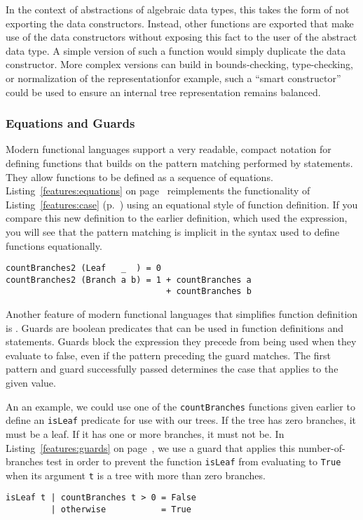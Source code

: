 In the context of abstractions of algebraic data types, this takes the form of not exporting the data constructors. Instead, other functions are exported that make use of the data constructors without exposing this fact to the user of the abstract data type. A simple version of such a function would simply duplicate the data constructor. More complex versions can build in bounds-checking, type-checking, or normalization of the representation\empause for example, such a ``smart constructor'' could be used to ensure an internal tree representation remains balanced.

\subsubsection{Equations and Guards}
Modern functional languages support a very readable, compact notation for defining functions that builds on the pattern matching performed by  statements. They allow functions to be defined as a sequence of equations. Listing~\ref{features:equations} on page~\pageref{features:equations} reimplements the functionality of Listing~\ref{features:case} (p.~\pageref{features:case}) using an equational style of function definition. If you compare this new definition to the earlier definition, which used the  expression, you will see that the pattern matching is implicit in the syntax used to define functions equationally.

\begin{lstlisting}[float,caption={Pattern-matching via equational function definition},label={features:equations}]
countBranches2 (Leaf   _  ) = 0
countBranches2 (Branch a b) = 1 + countBranches a
                                + countBranches b
\end{lstlisting}


Another feature of modern functional languages that simplifies function definition is . Guards are boolean predicates that can be used in function definitions and  statements. Guards block the expression they precede from being used when they evaluate to false, even if the pattern preceding the guard matches. The first pattern and guard successfully passed determines the case that applies to the given value.

An an example, we could use one of the \lstinline{countBranches} functions given earlier to define an \lstinline{isLeaf} predicate for use with our trees. If the tree has zero branches, it must be a leaf. If it has one or more branches, it must not be. In Listing~\ref{features:guards} on page~\pageref{features:guards}, we use a guard that applies this number-of-branches test in order to prevent the function \lstinline{isLeaf} from evaluating to \lstinline{True} when its argument \lstinline{t} is a tree with more than zero branches.
\begin{lstlisting}[float,caption={Cases with guards},label={features:guards}]
isLeaf t | countBranches t > 0 = False
         | otherwise           = True
\end{lstlisting}

